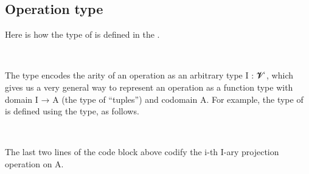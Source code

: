 \documentclass[a4paper,UKenglish,cleveref,autoref,thm-restate]{lipics-v2021}
\begin{document}
\subsection{Operation type}\label{sec:operation-type}
Here is how the type of  is defined in the \ualib.
\ccpad
\begin{code}%
\>[0]\AgdaSpace{}%
\AgdaSymbol{:}\AgdaSpace{}%
\AgdaSpace{}%
\AgdaSpace{}%
\AgdaSpace{}%
\AgdaSpace{}%
\AgdaSpace{}%
\AgdaSpace{}%
\AgdaSpace{}%
\AgdaSpace{}%
\AgdaSpace{}%
\<%
\\
%
\>[0]\AgdaSpace{}%
\AgdaSpace{}%
\AgdaSpace{}%
\AgdaSymbol{=}\AgdaSpace{}%
\AgdaSymbol{(}\AgdaSpace{}%
\AgdaSpace{}%
\AgdaSymbol{)}\AgdaSpace{}%
\AgdaSpace{}%
\end{code}
\ccpad
The type  encodes the arity of an operation as an arbitrary type \ab I : \ab 𝓥 ̇, which gives us a very general way to represent an operation as a function type with domain \ab I → \ab A (the type of ``tuples'') and codomain \ab A.  For example, the type of  is defined using the  type, as follows.
\ccpad
\begin{code}
\>[1]\AgdaSpace{}%
\AgdaSymbol{:}\AgdaSpace{}%
\AgdaSymbol{\{}\AgdaSpace{}%
\AgdaSymbol{:}\AgdaSpace{}%
\AgdaSpace{}%
\AgdaSpace{}%
\AgdaSymbol{\}}\AgdaSpace{}%
\AgdaSymbol{\{}\AgdaSpace{}%
\AgdaSymbol{:}\AgdaSpace{}%
\AgdaSpace{}%
\AgdaSpace{}%
\AgdaSymbol{\}}\AgdaSpace{}%
\AgdaSpace{}%
\AgdaSpace{}%
\AgdaSpace{}%
\AgdaSpace{}%
\AgdaSpace{}%
\<%
\\
%
\>[1]\AgdaSpace{}%
\AgdaSpace{}%
\AgdaSpace{}%
\AgdaSymbol{=}\AgdaSpace{}%
\AgdaSpace{}%
\<%
\end{code}
\ccpad
The last two lines of the code block above codify the \ab i-th \ab I-ary projection operation on \ab A.
\end{document}
